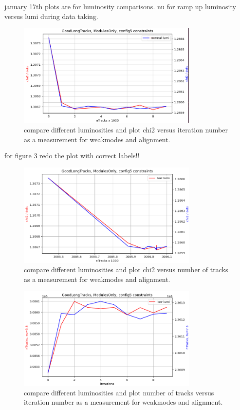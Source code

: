 january 17th plots are for luminosity comparisons.
nu for ramp up luminosity versus lumi during data taking.

\begin{figure}
  \centering
  \includegraphics[width=0.8\textwidth]{plots/jan_17_2022/chi2_iter_low_vs_normal.png}
  \caption{compare different luminosities and plot chi2 versus iteration number as a measurement for weakmodes and alignment.}
  \label{fig:chi2iter_lumi_normal}
\end{figure}

for figure \ref{fig:chi2iter_lumi_normal} redo the plot with correct labels!!

\begin{figure}
  \centering
  \includegraphics[width=0.8\textwidth]{plots/jan_17_2022/chi2_tracks_modulesOnly.png}
  \caption{compare different luminosities and plot chi2 versus number of tracks as a measurement for weakmodes and alignment.}
  \label{fig:chi2tracks_lumi_normal}
\end{figure}

\begin{figure}
  \centering
  \includegraphics[width=0.8\textwidth]{plots/jan_17_2022/tracks_vs_iterations_modulesOnly.png}
  \caption{compare different luminosities and plot number of tracks versus iteration number as a measurement for weakmodes and alignment.}
  \label{fig:chi2iter_lumi_normal}
\end{figure}

